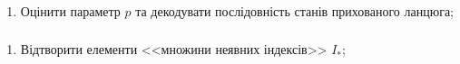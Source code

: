 \documentclass[12pt,mathserif]{beamer}
\theoremstyle{plain}
\begin{document}
\begin{frame}[t]
    \frametitle{\insertsection}
    \begin{enumerate}[1]
        \item Оцінити параметр $p$ та декодувати послідовність станів прихованого ланцюга;
    \end{enumerate}

    \begin{figure}[H]
        
    \end{figure}
\end{frame}

\begin{frame}[t]
    \frametitle{\insertsection}
    \begin{enumerate}[2]
        \item Відтворити елементи <<множини неявних індексів>> $I_*$;
    \end{enumerate}
    \vspace{1cm}

    \begin{figure}[H]\centering
        
    \end{figure}
\end{frame}
\end{document}
